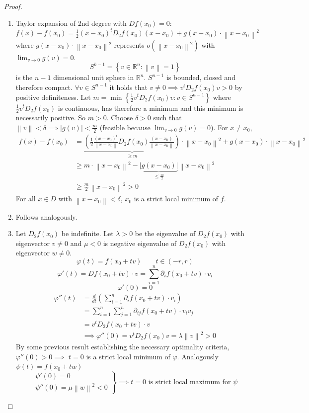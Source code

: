 \documentclass{article}
\newcommand{\set}[1]{\left\{#1\right\}}
\newcommand{\norm}[1]{\left\|#1\right\|}
\newcommand{\card}[1]{\left|#1\right|}
\begin{document}
\begin{proof}
  \begin{enumerate}
    \item Taylor expansion of 2nd degree with $Df(x_0) = 0$: $f(x) - f(x_0) = \frac12 (x - x_0)^t D_2 f(x_0) (x - x_0) + g(x - x_0) \cdot \norm{x - x_0}^2$ where $g(x - x_0) \cdot \norm{x - x_0}^2$ represents $o(\norm{x - x_0}^2)$ with $\lim_{v \to 0} g(v) = 0$.
      \[ S^{k-1} = \set{v \in \mathbb R^n: \norm{v} = 1} \]
      is the $n-1$ dimensional unit sphere in $\mathbb R^n$.
      $S^{n-1}$ is bounded, closed and therefore compact. $\forall v \in S^{n-1}$ it holds that $v \neq 0 \implies v^t D_2 f(x_0) v > 0$ by positive definiteness.
      Let $m = \min\set{\frac12 v^t D_2 f(x_0) v: v \in S^{n-1}}$ where $\frac12 v^t D_2 f(x_0)$ is continuous, has therefore a minimum and this minimum is necessarily positive. So $m > 0$.
      Choose $\delta > 0$ such that $\norm{v} < \delta \implies \card{g(v)} < \frac{m}{2}$ (feasible because $\lim_{v\to0} g(v) = 0$).
      For $x \neq x_0$,
      \begin{align*}
        f(x) - f(x_0) &= \underbrace{\left(\frac12 \frac{(x - x_0)^t}{\norm{x - x_0}} D_2 f(x_0) \frac{(x - x_0)}{\norm{x - x_0}}\right)}_{\geq m} \cdot \norm{x - x_0}^2 + g(x - x_0) \cdot \norm{x - x_0}^2 \\
          &\geq m \cdot \norm{x - x_0}^2 - \underbrace{\card{g(x - x_0)}}_{\leq \frac m2} \norm{x - x_0}^2 \\
          &\geq \frac m2 \norm{x - x_0}^2 > 0
      \end{align*}
      For all $x \in D$ with $\norm{x - x_0} < \delta$, $x_0$ is a strict local minimum of $f$.
    \item Follows analogously.
    \item Let $D_2 f(x_0)$ be indefinite. Let $\lambda > 0$ be the eigenvalue of $D_2 f(x_0)$ with eigenvector $v \neq 0$ and $\mu < 0$ is negative eigenvalue of $D_2 f(x_0)$ with eigenvector $w \neq 0$.
      \[ \varphi(t) = f(x_0 + tv) \qquad t \in (-r, r) \]
      \[ \varphi'(t) = Df(x_0 + tv) \cdot v = \sum_{i=1}^n \partial_i f(x_0 + tv) \cdot v_i \]
      \[ \varphi'(0) = 0 \]
      \begin{align*}
        \varphi''(t) &= \frac{d}{dt} \left(\sum_{i=1}^n \partial_i f(x_0 + tv) \cdot v_i\right) \\
            &= \sum_{i=1}^n \sum_{j=1}^n \partial_{ij} f(x_0 + tv) \cdot v_i v_j \\
            &= v^t D_2 f(x_0 + tv) \cdot v \\
            &\implies \varphi''(0) = v^t D_2 f(x_0) v = \lambda \norm{v}^2 > 0
      \end{align*}
      By some previous result establishing the necessary optimality criteria, $\varphi''(0) > 0 \implies$ $t=0$ is a strict local minimum of $\varphi$.
      Analogously $\psi(t) = f(x_0 + tw)$
      \[
        \left.\begin{array}{c}
          \psi'(0) = 0 \\
          \psi''(0) = \mu \norm{w}^2 < 0
        \end{array}\right\}
        \implies \text{$t = 0$ is strict local maximum for $\psi$}
      \]


\end{enumerate}
\end{proof}
\end{document}
